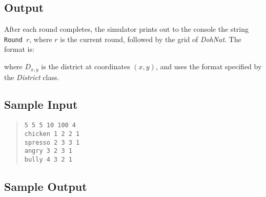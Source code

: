 \documentclass[12pt,pdftex]{article}
\begin{document}
\subsection*{Output}
After each round completes, the simulator prints out to the 
console the string {\tt Round $r$}, where $r$ is the current round,
followed by the grid of {\it DohNat}.  The format is:
\begin{quote}
\end{quote}
where $D_{x,y}$ is the district at coordinates $(x,y)$, and uses the format
specified by the {\it District} class.

\subsection*{Sample Input }
\begin{quote}
\begin{verbatim}
5 5 5 10 100 4
chicken 1 2 2 1
spresso 2 3 3 1
angry 3 2 3 1
bully 4 3 2 1
\end{verbatim}
\end{quote}

\subsection*{Sample Output}
\begin{quote}

\end{quote}
\end{document}
